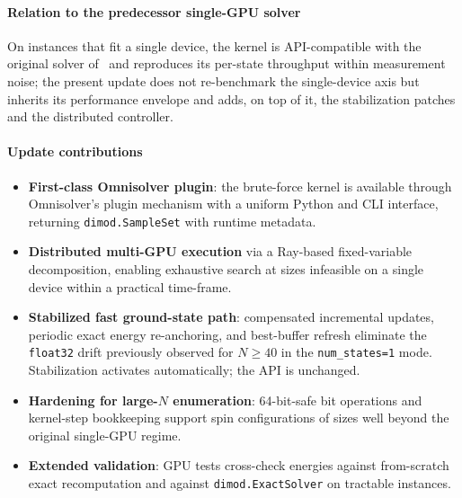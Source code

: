 \documentclass[preprint,12pt,a4paper]{elsarticle}
\begin{document}
\paragraph{Relation to the predecessor single-GPU solver}
On instances that fit a single device, the kernel is API-compatible with
the original solver of~\cite{jalowiecki2021brute} and reproduces its
per-state throughput within measurement noise; the present update does not
re-benchmark the single-device axis but inherits its performance envelope
and adds, on top of it, the stabilization patches and the distributed
controller.

\paragraph{Update contributions}
\begin{itemize}
    \item \textbf{First-class Omnisolver plugin}: the brute-force kernel is
    available through Omnisolver's plugin mechanism with a uniform Python and
    CLI interface, returning \texttt{dimod.SampleSet} with runtime metadata.
    \item \textbf{Distributed multi-GPU execution} via a Ray-based fixed-variable
    decomposition, enabling exhaustive search at sizes infeasible on a single
    device within a practical time-frame.
    \item \textbf{Stabilized fast ground-state path}: compensated incremental
    updates, periodic exact energy re-anchoring, and best-buffer refresh
    eliminate the \texttt{float32} drift previously observed for $N \geq 40$
    in the \texttt{num\_states=1} mode. Stabilization activates automatically;
    the API is unchanged.
    \item \textbf{Hardening for large-$N$ enumeration}: 64-bit-safe bit
    operations and kernel-step bookkeeping support spin configurations of
    sizes well beyond the original single-GPU regime.
    \item \textbf{Extended validation}: GPU tests cross-check energies against
    from-scratch exact recomputation and against \texttt{dimod.ExactSolver} on
    tractable instances.
\end{itemize}
\end{document}
